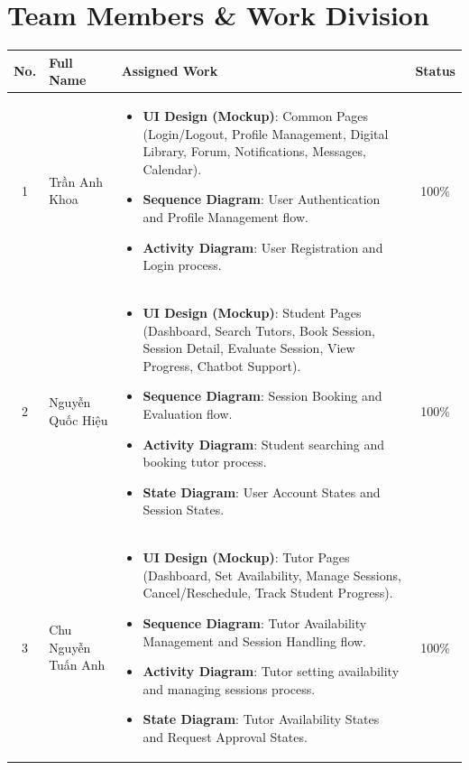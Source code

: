 \section{Team Members \& Work Division}
\vspace{-0.5cm}
\begin{longtable}{|c|l|p{}|c|}
  \hline
  \textbf{No.} & \textbf{Full Name} & \textbf{Assigned Work} & \textbf{Status} \\
  \hline
  \endhead

  1 & Trần Anh Khoa
    & \begin{itemize}[leftmargin=*, nosep]
        \item \textbf{UI Design (Mockup)}: Common Pages (Login/Logout, Profile Management, Digital Library, Forum, Notifications, Messages, Calendar).
        \item \textbf{Sequence Diagram}: User Authentication and Profile Management flow.
        \item \textbf{Activity Diagram}: User Registration and Login process.
      \end{itemize}
    & 100\% \\ \hline

  2 & Nguyễn Quốc Hiệu
    & \begin{itemize}[leftmargin=*, nosep]
        \item \textbf{UI Design (Mockup)}: Student Pages (Dashboard, Search Tutors, Book Session, Session Detail, Evaluate Session, View Progress, Chatbot Support).
        \item \textbf{Sequence Diagram}: Session Booking and Evaluation flow.
        \item \textbf{Activity Diagram}: Student searching and booking tutor process.
        \item \textbf{State Diagram}: User Account States and Session States.
      \end{itemize}
    & 100\% \\ \hline

  3 & Chu Nguyễn Tuấn Anh
    & \begin{itemize}[leftmargin=*, nosep]
        \item \textbf{UI Design (Mockup)}: Tutor Pages (Dashboard, Set Availability, Manage Sessions, Cancel/Reschedule, Track Student Progress).
        \item \textbf{Sequence Diagram}: Tutor Availability Management and Session Handling flow.
        \item \textbf{Activity Diagram}: Tutor setting availability and managing sessions process.
        \item \textbf{State Diagram}: Tutor Availability States and Request Approval States.
      \end{itemize}
    & 100\% \\ \hline


\end{longtable}
